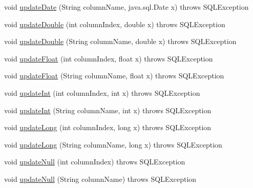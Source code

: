 \begin{DoxyCompactItemize}
\item 
void \mbox{\hyperlink{classcom_1_1mysql_1_1cj_1_1jdbc_1_1result_1_1_result_set_impl_afc4fe09de9b86151ab985f3970906773}{update\+Date}} (String column\+Name, java.\+sql.\+Date x)  throws S\+Q\+L\+Exception 
\item 
void \mbox{\hyperlink{classcom_1_1mysql_1_1cj_1_1jdbc_1_1result_1_1_result_set_impl_a7dbd79b44b951e557ca9324d09dd4132}{update\+Double}} (int column\+Index, double x)  throws S\+Q\+L\+Exception 
\item 
void \mbox{\hyperlink{classcom_1_1mysql_1_1cj_1_1jdbc_1_1result_1_1_result_set_impl_a3533766fe417d76a41578814596d7348}{update\+Double}} (String column\+Name, double x)  throws S\+Q\+L\+Exception 
\item 
void \mbox{\hyperlink{classcom_1_1mysql_1_1cj_1_1jdbc_1_1result_1_1_result_set_impl_a87ff914a334e0cf8b198f9ff52569a7e}{update\+Float}} (int column\+Index, float x)  throws S\+Q\+L\+Exception 
\item 
void \mbox{\hyperlink{classcom_1_1mysql_1_1cj_1_1jdbc_1_1result_1_1_result_set_impl_a5b92f4eaf7fa00b5676b2e9291820649}{update\+Float}} (String column\+Name, float x)  throws S\+Q\+L\+Exception 
\item 
void \mbox{\hyperlink{classcom_1_1mysql_1_1cj_1_1jdbc_1_1result_1_1_result_set_impl_a02247fe2206ee6c531d0379e768fc934}{update\+Int}} (int column\+Index, int x)  throws S\+Q\+L\+Exception 
\item 
void \mbox{\hyperlink{classcom_1_1mysql_1_1cj_1_1jdbc_1_1result_1_1_result_set_impl_a29c623487ce11fe4279850a54c0fd752}{update\+Int}} (String column\+Name, int x)  throws S\+Q\+L\+Exception 
\item 
void \mbox{\hyperlink{classcom_1_1mysql_1_1cj_1_1jdbc_1_1result_1_1_result_set_impl_a44cf6f500eed2a8075ca17dd5bb52cdf}{update\+Long}} (int column\+Index, long x)  throws S\+Q\+L\+Exception 
\item 
void \mbox{\hyperlink{classcom_1_1mysql_1_1cj_1_1jdbc_1_1result_1_1_result_set_impl_afcbf148ad9a18b818c1c73aa25804a01}{update\+Long}} (String column\+Name, long x)  throws S\+Q\+L\+Exception 
\item 
void \mbox{\hyperlink{classcom_1_1mysql_1_1cj_1_1jdbc_1_1result_1_1_result_set_impl_a95e6cbfe934307372f7552069006aac9}{update\+Null}} (int column\+Index)  throws S\+Q\+L\+Exception 
\item 
void \mbox{\hyperlink{classcom_1_1mysql_1_1cj_1_1jdbc_1_1result_1_1_result_set_impl_a81f57485d1f78af42e12449cd9df527d}{update\+Null}} (String column\+Name)  throws S\+Q\+L\+Exception 

\end{DoxyCompactItemize}
